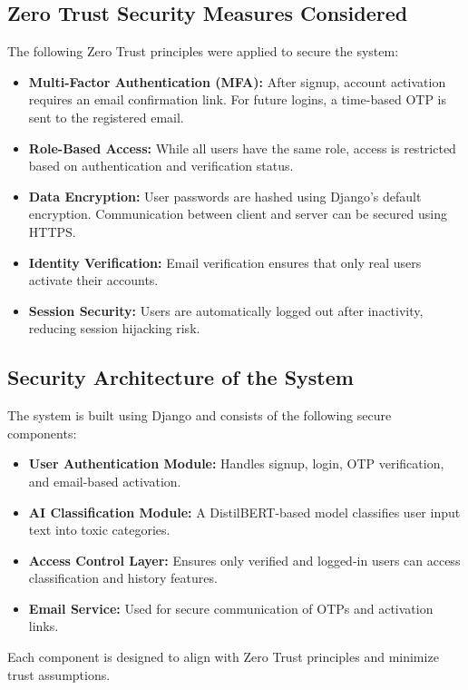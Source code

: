 \documentclass[a4paper,12pt]{article}
\begin{document}
\subsection{Zero Trust Security Measures Considered}
The following Zero Trust principles were applied to secure the system:
\begin{itemize}
    \item \textbf{Multi-Factor Authentication (MFA):} After signup, account activation requires an email confirmation link. For future logins, a time-based OTP is sent to the registered email.
    \item \textbf{Role-Based Access:} While all users have the same role, access is restricted based on authentication and verification status.
    \item \textbf{Data Encryption:} User passwords are hashed using Django’s default encryption. Communication between client and server can be secured using HTTPS.
    \item \textbf{Identity Verification:} Email verification ensures that only real users activate their accounts.
    \item \textbf{Session Security:} Users are automatically logged out after inactivity, reducing session hijacking risk.
\end{itemize}

\subsection{Security Architecture of the System}
The system is built using Django and consists of the following secure components:
\begin{itemize}
    \item \textbf{User Authentication Module:} Handles signup, login, OTP verification, and email-based activation.
    \item \textbf{AI Classification Module:} A DistilBERT-based model classifies user input text into toxic categories.
    \item \textbf{Access Control Layer:} Ensures only verified and logged-in users can access classification and history features.
    \item \textbf{Email Service:} Used for secure communication of OTPs and activation links.
\end{itemize}
Each component is designed to align with Zero Trust principles and minimize trust assumptions.
\end{document}
